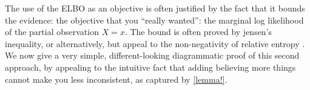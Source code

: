 \documentclass[twoside]{article}
\makeatletter
\theoremstyle{plain}
\newtheorem{prop}[theorem]{Proposition}
\theoremstyle{definition}
\let\H\relax
\DeclareMathOperator{\H}{\mathrm{H}} %
\DeclareMathOperator*{\Ex}{\mathbb{E}} %
\newcommand{\datadist}[1]{\Pr\nolimits_{#1}}
\newcommand\aar{\@ifstar\aar@one@star\aar@plain}
\newcommand\aar@one@star{\@ifstar\aar@resize{\aar@plain*}}
\newcommand\aar@resize[1]{\sbox{\aar@content}{#1}\scaleleftright[3.8ex]
		{\Biggl\langle\!\!\!\!\Biggl\langle}{\usebox{\aar@content}}
		{\Biggr\rangle\!\!\!\!\Biggr\rangle}}
\makeatother
\begin{document}
%
%
%
%
%



The use of the ELBO as an objective is often justified by the fact that it bounds the evidence: the objective that you ``really wanted'': the marginal log likelihood of the partial observation $X=x$.
The bound is often proved by jensen's inequality, or alternatively, but appeal to the non-negativity of relative entropy \cite{elboproofs}.
We now give a very simple, different-looking diagrammatic proof of this second approach, by appealing to the intuitive fact that adding believing more things cannot make you less inconsistent, as captured by \cref{lemma!}.
\end{document}
